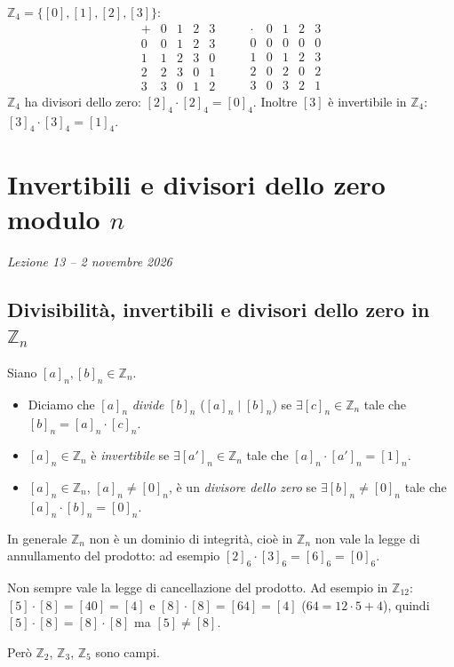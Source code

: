 \documentclass[11pt,a4paper]{article}
\begin{document}
$\mathbb{Z}_4 = \{[0], [1], [2], [3]\}$:
\[
\begin{array}{c|cccc} + & 0 & 1 & 2 & 3 \\ \hline 0 & 0 & 1 & 2 & 3 \\ 1 & 1 & 2 & 3 & 0 \\ 2 & 2 & 3 & 0 & 1 \\ 3 & 3 & 0 & 1 & 2 \end{array}
\qquad
\begin{array}{c|cccc} \cdot & 0 & 1 & 2 & 3 \\ \hline 0 & 0 & 0 & 0 & 0 \\ 1 & 0 & 1 & 2 & 3 \\ 2 & 0 & 2 & 0 & 2 \\ 3 & 0 & 3 & 2 & 1 \end{array}
\]
$\mathbb{Z}_4$ ha divisori dello zero: $[2]_4\cdot[2]_4 = [0]_4$. Inoltre $[3]$ è invertibile in $\mathbb{Z}_4$: $[3]_4\cdot[3]_4 = [1]_4$.

\section[Invertibili e divisori dello zero modulo $n$ (Lezione 13 -- 2 novembre 2026)]{Invertibili e divisori dello zero modulo $n$}
\noindent\emph{Lezione 13 -- 2 novembre 2026}
\subsection{Divisibilità, invertibili e divisori dello zero in $\mathbb{Z}_n$}

\begin{definizione}
Siano $[a]_n, [b]_n \in \mathbb{Z}_n$.
\begin{itemize}
  \item Diciamo che $[a]_n$ \emph{divide} $[b]_n$ ($[a]_n \mid [b]_n$) se $\exists [c]_n \in \mathbb{Z}_n$ tale che $[b]_n = [a]_n\cdot[c]_n$.
  \item $[a]_n \in \mathbb{Z}_n$ è \emph{invertibile} se $\exists [a']_n \in \mathbb{Z}_n$ tale che $[a]_n\cdot[a']_n = [1]_n$.
  \item $[a]_n \in \mathbb{Z}_n$, $[a]_n \neq [0]_n$, è un \emph{divisore dello zero} se $\exists [b]_n \neq [0]_n$ tale che $[a]_n\cdot[b]_n = [0]_n$.
\end{itemize}
\end{definizione}

\begin{osservazione}
In generale $\mathbb{Z}_n$ non è un dominio di integrità, cioè in $\mathbb{Z}_n$ non vale la legge di annullamento del prodotto: ad esempio $[2]_6\cdot[3]_6 = [6]_6 = [0]_6$.

Non sempre vale la legge di cancellazione del prodotto. Ad esempio in $\mathbb{Z}_{12}$: $[5]\cdot[8] = [40] = [4]$ e $[8]\cdot[8] = [64] = [4]$ ($64 = 12\cdot 5 + 4$), quindi $[5]\cdot[8] = [8]\cdot[8]$ ma $[5] \neq [8]$.

Però $\mathbb{Z}_2$, $\mathbb{Z}_3$, $\mathbb{Z}_5$ sono campi.
\end{osservazione}
\end{document}

